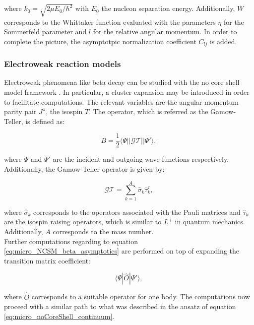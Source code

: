 \documentclass[openany]{book}
\begin{document}
where $k_0 = \sqrt{2\mu E_0/\hbar^2}$ with $E_0$ the nucleon separation energy. Additionally, $W$ corresponds to the Whittaker function evaluated with the parameters $\eta$ for the Sommerfeld parameter and $l$ for the relative angular momentum. In order to complete the picture, the asymptotpic normalization coefficient $C_{lj}$ is added.  \\


\subsubsection{Electroweak reaction models} \label{ssub:micro_abinitio_electroweak}

Electroweak phenomena like beta decay can be studied with the no core shell model framework \cite{atkinson_navratil_hupin_kravvaris_quaglioni_2022}. In particular, a cluster expansion may be introduced in order to facilitate computations. The relevant variables are the angular momentum parity pair $J^\pi$, the isospin $T$. The operator, which is referred as the Gamow-Teller, is defined as: 

\begin{equation}\label{eq:micro_NCSM_beta_asymptotics}
	B = \frac{1}{2} \langle \Psi || \mathcal{GT} || \Psi ' \rangle, 
\end{equation}

where $\Psi$ and $\Psi'$ are the incident and outgoing wave functions respectively. Additionally, the Gamow-Teller operator is given by: 

\begin{equation}\label{eq:micro_NCSM_beta_GToperator}
	\mathcal{GT} = \sum_{k = 1}^{A} \hat \sigma_k \hat \tau_k^{\tau},
\end{equation}

where $\hat \sigma_k$ corresponds to the operators associated with the Pauli matrices and $\hat \tau_k$ are the isospin raising operators, which is similar to $L^{+}$ in quantum mechanics. Additionally, $A$ corresponds to the mass number. \\ 

Further computations regarding to equation \ref{eq:micro_NCSM_beta_asymptotics} are performed on top of expanding the transition matrix coefficient: 

\begin{equation}\label{eq:micro_NCSM_beta_transition}
	\langle \Psi | \hat O |  \Psi ' \rangle,
\end{equation}

where $\hat O$ corresponds to a suitable operator for one body. The computations now proceed with a similar path to what was described in the ansatz of equation \ref{eq:micro_noCoreShell_continuum}. \\
\end{document}
